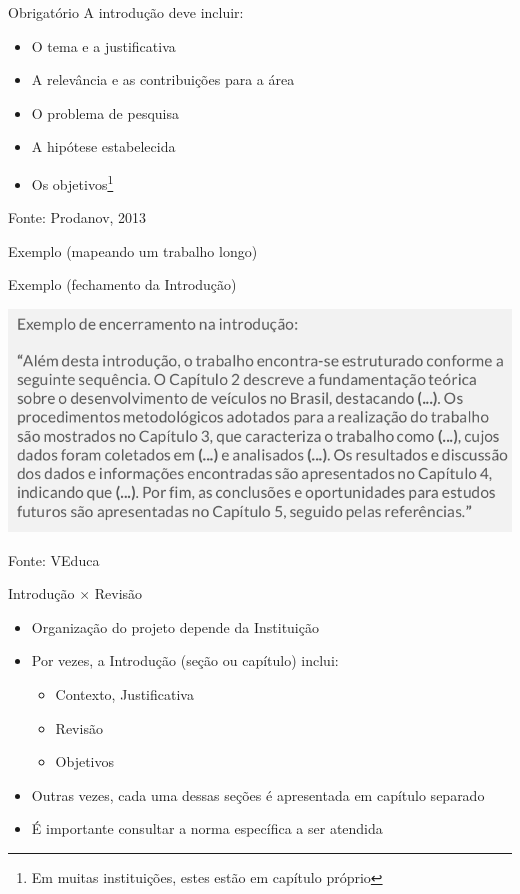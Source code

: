 \documentclass{beamer}
\begin{document}
\begin{frame}{Obrigatório}
  \scriptsize
  A introdução deve incluir:
  \bigskip
  \begin{itemize}
    \footnotesize
  \item O tema e a justificativa
  \bigskip
  \item A relevância e as contribuições para a área
  \bigskip
  \item O problema de pesquisa
  \bigskip
  \item A hipótese estabelecida
  \bigskip
  \item Os objetivos\footnote{Em muitas instituições, estes estão em capítulo próprio}
  \end{itemize}

  \vfill
  \scriptsize
  Fonte: Prodanov, 2013
\end{frame}

\begin{frame}{Exemplo (mapeando um trabalho longo)}
  \begin{exampleblock}{Exemplo (fechamento da Introdução)}
    \begin{center}
      \includegraphics[width=\textwidth]{EstruturaI/exemplo-introducao}
    \end{center}
  \end{exampleblock}

  \vfill
  \scriptsize
  Fonte: VEduca
\end{frame}

\begin{frame}{Introdução $\times$ Revisão}
  \begin{itemize}
    \footnotesize
  \item Organização do projeto depende da Instituição
  \bigskip
  \item Por vezes, a Introdução (seção ou capítulo) inclui:
    \begin{itemize}
      \scriptsize
    \item Contexto, Justificativa
    \item Revisão
    \item Objetivos
    \end{itemize}
  \bigskip
  \item Outras vezes, cada uma dessas seções é apresentada em capítulo
    separado
  \bigskip
  \item É importante \alert{consultar} a norma \alert{específica} a
    ser atendida
  \end{itemize}
\end{frame}
\end{document}
